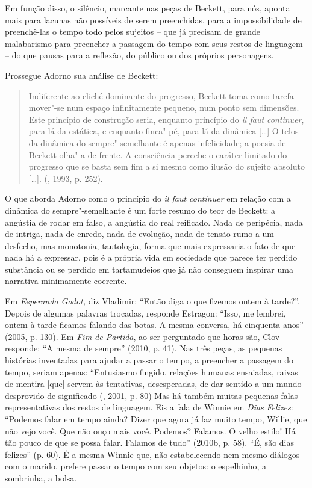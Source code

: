 Em função disso, o silêncio, marcante nas peças de Beckett, para nós,
aponta mais para lacunas não possíveis de serem preenchidas, para a
impossibilidade de preenchê-las o tempo todo pelos sujeitos -- que já
precisam de grande malabarismo para preencher a passagem do tempo com
seus restos de linguagem -- do que pausas para a reflexão, do público ou
dos próprios personagens.

Prossegue Adorno sua análise de Beckett:

\begin{quote}
Indiferente ao cliché dominante do progresso, Beckett toma como tarefa
mover"-se num espaço infinitamente pequeno, num ponto sem dimensões. Este
princípio de construção seria, enquanto princípio do \emph{il faut
continuer}, para lá da estática, e enquanto finca"-pé, para lá da
dinâmica [\ldots{}] O telos da dinâmica do sempre"-semelhante é
apenas infelicidade; a poesia de Beckett olha"-a de frente. A consciência
percebe o caráter limitado do progresso que se basta sem fim a si mesmo
como ilusão do sujeito absoluto [\ldots{}]. (, 1993, p.
252).
\end{quote}

O que aborda Adorno como o princípio do \emph{il faut continuer} em
relação com a dinâmica do sempre"-semelhante é um forte resumo do teor de
Beckett: a angústia de rodar em falso, a angústia do real reificado.
Nada de peripécia, nada de intriga, nada de enredo, nada de evolução,
nada de tensão rumo a um desfecho, mas monotonia, tautologia, forma que
mais expressaria o fato de que nada há a expressar, pois é a própria
vida em sociedade que parece ter perdido substância ou se perdido em
tartamudeios que já não conseguem inspirar uma narrativa minimamente coerente.

Em \emph{Esperando Godot,} diz Vladimir: ``Então diga o que fizemos
ontem à tarde?''. Depois de algumas palavras trocadas, responde
Estragon: ``Isso, me lembrei, ontem à tarde ficamos falando das botas. A
mesma conversa, há cinquenta anos'' (2005, p. 130). Em \emph{Fim de
Partida}, ao ser perguntado que horas são, Clov responde: ``A mesma de
sempre'' (2010, p. 41). Nas três peças, as pequenas histórias inventadas
para ajudar a passar o tempo, a preencher a passagem do tempo, seriam
apenas: ``Entusiasmo fingido, relações humanas ensaiadas, raivas de
mentira [que] servem às tentativas, desesperadas, de dar sentido a
um mundo desprovido de significado (, 2001, p. 80) Mas há também
muitas pequenas falas representativas dos restos de linguagem. Eis a
fala de Winnie em \emph{Dias} \emph{Felizes}: ``Podemos falar em tempo
ainda? Dizer que agora já faz muito tempo, Willie, que não vejo você.
Que não ouço mais você. Podemos? Falamos. O velho estilo! Há tão pouco
de que se possa falar. Falamos de tudo'' (2010b, p. 58). ``É, são dias
felizes'' (p. 60). É a mesma Winnie que, não estabelecendo nem mesmo
diálogos com o marido, prefere passar o tempo com seu objetos: o
espelhinho, a sombrinha, a bolsa.

